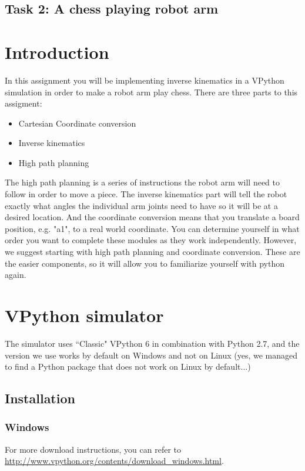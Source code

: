 \documentclass[10pt]{scrartcl}
\begin{document}
\subsection{Task 2: A chess playing robot arm}
\label{sec:Inversekinematics}

\section*{Introduction}

In this assignment you will be implementing inverse kinematics in a VPython simulation in order to make a robot arm play chess. There are three parts to this assigment:
\begin{itemize}
    \item Cartesian Coordinate conversion
    \item Inverse kinematics
    \item High path planning    
\end{itemize}
The high path planning is a series of instructions the robot arm will need to follow in order to move a piece. The inverse kinematics part will tell the robot exactly what angles the individual arm joints need to have so it will be at a desired location. And the coordinate conversion means that you translate a board position, e.g. "a1", to a real world coordinate. You can determine yourself in what order you want to complete these modules as they work independently. However, we suggest starting with high path planning and coordinate conversion. These are the easier components, so it will allow you to familiarize yourself with python again.

\section*{VPython simulator}
The simulator uses ``Classic" VPython 6 in combination with Python 2.7, and the version we use works by default on Windows and not on Linux (yes, we managed to find a Python package that does not work on Linux by default...)

\subsection*{Installation}
\subsubsection*{Windows}
For more download instructions, you can refer to \url{http://www.vpython.org/contents/download_windows.html}.
\end{document}
